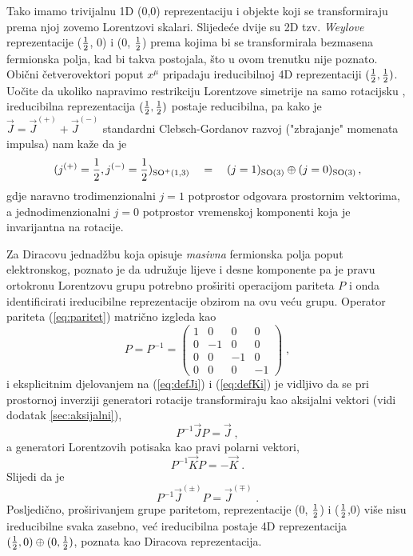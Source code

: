 Tako imamo trivijalnu 1D (0,0) reprezentaciju i objekte koji se
transformiraju prema njoj zovemo Lorentzovi skalari. Slijedeće
dvije su 2D tzv. \emph{Weylove} reprezentacije ($\frac{1}{2}$, 0) i
(0, $\frac{1}{2}$) prema kojima bi se transformirala bezmasena
fermionska polja, kad bi takva postojala, što u ovom trenutku nije poznato.
Obični četverovektori poput $x^\mu$ pripadaju ireducibilnoj
4D reprezentaciji $(\frac{1}{2}, \frac{1}{2})$. Uočite da ukoliko napravimo
restrikciju Lorentzove simetrije  na samo rotacijsku ,
ireducibilna reprezentacija $(\frac{1}{2}, \frac{1}{2})$ postaje reducibilna,
pa kako je $\vec{J}=\vec{J}^{(+)}+\vec{J}^{(-)}$ standardni 
Clebsch-Gordanov razvoj ("zbrajanje" momenata impulsa) nam kaže da
je 
\begin{equation}
(j^{(+)}=\frac{1}{2}, j^{(-)}=\frac{1}{2})_{\mathrm{SO}^{+}(1,3)} \quad = \quad(j=1)_{\mathrm{SO}(3)} \oplus (j=0)_{\mathrm{SO}(3)} \,,
\end{equation} 
gdje naravno trodimenzionalni $j=1$ potprostor odgovara prostornim vektorima,
a jednodimenzionalni $j=0$ potprostor vremenskoj komponenti koja je invarijantna
na rotacije.

Za Diracovu jednadžbu koja opisuje \emph{masivna} fermionska polja poput elektronskog, 
poznato je da udružuje lijeve
i desne komponente pa je  pravu
ortokronu Lorentzovu grupu potrebno proširiti operacijom pariteta $P$ i onda
identificirati ireducibilne reprezentacije obzirom
na ovu veću grupu. Operator pariteta (\ref{eq:paritet}) 
matrično izgleda kao
\begin{equation}
 P = P^{-1} =
\begin{pmatrix}
1 & 0 & 0 & 0 \\
0 & -1 & 0 & 0 \\
0 & 0 & -1 & 0 \\
0 & 0 & 0 & -1
\end{pmatrix} \;,
\end{equation}
i eksplicitnim djelovanjem na (\ref{eq:defJi}) i (\ref{eq:defKi}) 
je vidljivo da se pri prostornoj inverziji generatori rotacije
transformiraju kao aksijalni vektori (vidi dodatak \ref{sec:aksijalni}),
\begin{equation}
    P^{-1} \vec{J} P = \vec{J} \;,
\end{equation}
a generatori Lorentzovih potisaka kao pravi polarni vektori,
\begin{equation}
    P^{-1} \vec{K} P = - \vec{K} \;.
\end{equation}
Slijedi da je 
\begin{equation}
    P^{-1} \vec{J}^{(\pm)} P = \vec{J}^{(\mp)} \;.
\end{equation}
Posljedično, proširivanjem  grupe paritetom, reprezentacije
(0, $\frac{1}{2}$) i ($\frac{1}{2}$,0) više nisu ireducibilne svaka zasebno,
već ireducibilna postaje 4D reprezentacija $(\frac{1}{2}, 0) \oplus (0, \frac{1}{2})$, poznata
kao Diracova reprezentacija.


